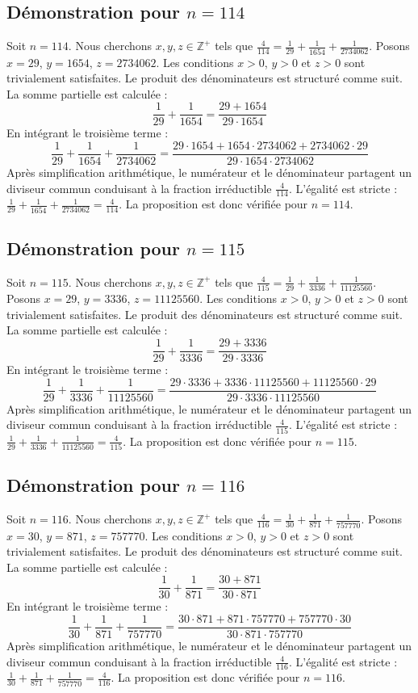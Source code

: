\documentclass[11pt,a4paper]{article}
\begin{document}
\subsection{Démonstration pour $n = 114$}
Soit $n = 114$. Nous cherchons $x, y, z \in \mathbb{Z}^{+}$ tels que $\frac{4}{114} = \frac{1}{29} + \frac{1}{1654} + \frac{1}{2734062}$.
Posons $x = 29$, $y = 1654$, $z = 2734062$.
Les conditions $x > 0$, $y > 0$ et $z > 0$ sont trivialement satisfaites.
Le produit des dénominateurs est structuré comme suit. La somme partielle est calculée :
$$ \frac{1}{29} + \frac{1}{1654} = \frac{29+1654}{29 \cdot 1654} $$
En intégrant le troisième terme :
$$ \frac{1}{29} + \frac{1}{1654} + \frac{1}{2734062} = \frac{29 \cdot 1654 + 1654 \cdot 2734062 + 2734062 \cdot 29}{29 \cdot 1654 \cdot 2734062} $$
Après simplification arithmétique, le numérateur et le dénominateur partagent un diviseur commun conduisant à la fraction irréductible $\frac{4}{114}$.
L'égalité est stricte : $\frac{1}{29} + \frac{1}{1654} + \frac{1}{2734062} = \frac{4}{114}$.
La proposition est donc vérifiée pour $n = 114$.
\subsection{Démonstration pour $n = 115$}
Soit $n = 115$. Nous cherchons $x, y, z \in \mathbb{Z}^{+}$ tels que $\frac{4}{115} = \frac{1}{29} + \frac{1}{3336} + \frac{1}{11125560}$.
Posons $x = 29$, $y = 3336$, $z = 11125560$.
Les conditions $x > 0$, $y > 0$ et $z > 0$ sont trivialement satisfaites.
Le produit des dénominateurs est structuré comme suit. La somme partielle est calculée :
$$ \frac{1}{29} + \frac{1}{3336} = \frac{29+3336}{29 \cdot 3336} $$
En intégrant le troisième terme :
$$ \frac{1}{29} + \frac{1}{3336} + \frac{1}{11125560} = \frac{29 \cdot 3336 + 3336 \cdot 11125560 + 11125560 \cdot 29}{29 \cdot 3336 \cdot 11125560} $$
Après simplification arithmétique, le numérateur et le dénominateur partagent un diviseur commun conduisant à la fraction irréductible $\frac{4}{115}$.
L'égalité est stricte : $\frac{1}{29} + \frac{1}{3336} + \frac{1}{11125560} = \frac{4}{115}$.
La proposition est donc vérifiée pour $n = 115$.
\subsection{Démonstration pour $n = 116$}
Soit $n = 116$. Nous cherchons $x, y, z \in \mathbb{Z}^{+}$ tels que $\frac{4}{116} = \frac{1}{30} + \frac{1}{871} + \frac{1}{757770}$.
Posons $x = 30$, $y = 871$, $z = 757770$.
Les conditions $x > 0$, $y > 0$ et $z > 0$ sont trivialement satisfaites.
Le produit des dénominateurs est structuré comme suit. La somme partielle est calculée :
$$ \frac{1}{30} + \frac{1}{871} = \frac{30+871}{30 \cdot 871} $$
En intégrant le troisième terme :
$$ \frac{1}{30} + \frac{1}{871} + \frac{1}{757770} = \frac{30 \cdot 871 + 871 \cdot 757770 + 757770 \cdot 30}{30 \cdot 871 \cdot 757770} $$
Après simplification arithmétique, le numérateur et le dénominateur partagent un diviseur commun conduisant à la fraction irréductible $\frac{4}{116}$.
L'égalité est stricte : $\frac{1}{30} + \frac{1}{871} + \frac{1}{757770} = \frac{4}{116}$.
La proposition est donc vérifiée pour $n = 116$.
\end{document}
